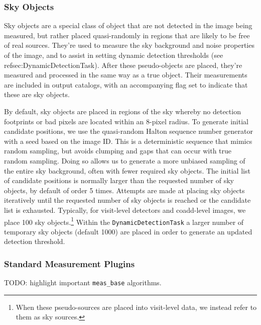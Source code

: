 \subsubsection{Sky Objects}
\label{sec:sky-objects}

Sky objects are a special class of object that are not detected in the image being measured, but rather placed quasi-randomly in regions that are likely to be free of real sources.
They're used to measure the sky background and noise properties of the image, and to assist in setting dynamic detection thresholds (see ref{sec:DynamicDetectionTask}).
After these pseudo-objects are placed, they're measured and processed in the same way as a true object.
Their measurements are included in output catalogs, with an accompanying flag set to indicate that these are sky objects.

By default, sky objects are placed in regions of the sky whereby no detection footprints or bad pixels are located within an 8-pixel radius.
To generate initial candidate positions, we use the quasi-random Halton sequence number generator with a seed based on the image ID.
This is a deterministic sequence that mimics random sampling, but avoids clumping and gaps that can occur with true random sampling.
Doing so allows us to generate a more unbiased sampling of the entire sky background, often with fewer required sky objects.
The initial list of candidate positions is normally larger than the requested number of sky objects, by default of order 5 times.
Attempts are made at placing sky objects iteratively until the requested number of sky objects is reached or the candidate list is exhausted.
Typically, for visit-level detectors and coadd-level images, we place 100 sky objects.\footnote{When these pseudo-sources are placed into visit-level data, we instead refer to them as sky sources.}
Within the \texttt{DynamicDetectionTask} a larger number of temporary sky objects (default 1000) are placed in order to generate an updated detection threshold.

\subsubsection{Standard Measurement Plugins}

TODO: highlight important \texttt{meas\_base} algorithms.








